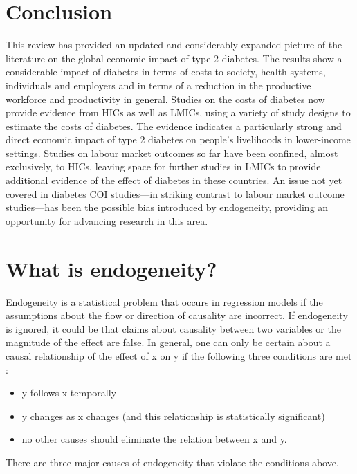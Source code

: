 \section{Conclusion}

This review has provided an updated and considerably expanded picture of the literature on the global economic impact of type 2 diabetes. The results show a considerable impact of diabetes in terms of costs to society, health systems, individuals and employers and in terms of a reduction in the productive workforce and productivity in general. Studies on the costs of diabetes now provide evidence from \acp{HIC} as well as \acp{LMIC}, using a variety of study designs to estimate the costs of diabetes. The evidence indicates a particularly strong and direct economic impact of type 2 diabetes on people's livelihoods in lower-income settings. Studies on labour market outcomes so far have been confined, almost exclusively, to \acp{HIC}, leaving space for further studies in \acp{LMIC} to provide additional evidence of the effect of diabetes in these countries. An issue not yet covered in diabetes \ac{COI} studies---in striking contrast to labour market outcome studies---has been the possible bias introduced by endogeneity, providing an opportunity for advancing research in this area. 
\clearpage
\section*{What is endogeneity?}
Endogeneity is a statistical problem that occurs in regression models if the assumptions about the flow or direction of causality are incorrect. If endogeneity is ignored, it could be that claims about causality between two variables or the magnitude of the effect are false. In general, one can only be certain about a causal relationship of the effect of x on y if the following three conditions are met \parencite{Antonakis2012}:

\begin{itemize}
\item	y follows x temporally
\item	y changes as x changes (and this relationship is statistically significant)
\item	no other causes should eliminate the relation between x and y.
\end{itemize}

There are three major causes of endogeneity that violate the conditions above.

